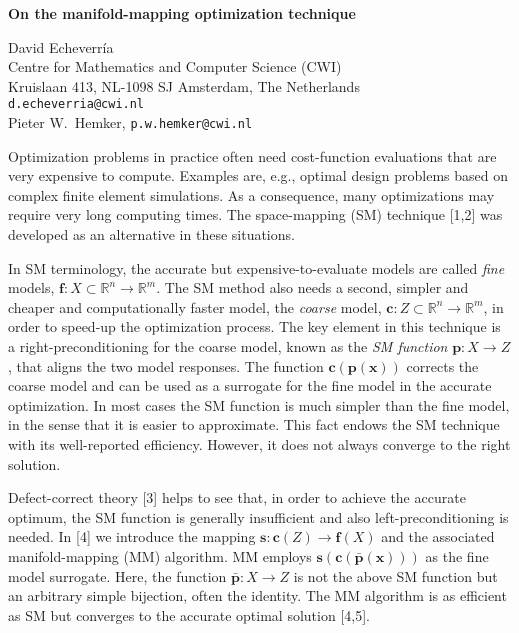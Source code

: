 \documentclass{report}
\newcommand{\Reals}{\mathbb{R}}
\begin{document}

\begin{center}
{\large
{\bf On the manifold-mapping optimization technique}}

	David Echeverr\'{i}a \\
	Centre for Mathematics and Computer Science (CWI)\\
	Kruislaan 413, NL-1098 SJ Amsterdam, The Netherlands \\
	{\tt d.echeverria@cwi.nl} \\
	Pieter W.~Hemker, {\tt p.w.hemker@cwi.nl}
\end{center}
Optimization problems in practice
often need cost-function evaluations that are very expensive
to compute. Examples are, e.g., optimal design problems
based on complex finite element simulations. As a
consequence, many optimizations may require very long
computing times. The space-mapping (SM) technique
[1,2] was developed as an alternative
in these situations.

In SM terminology, the accurate but
expensive-to-evaluate models are called {\it fine} models,
${\mathbf f}:X \subset \Reals^n \to \Reals^m$.
The SM method also
needs a second, simpler and cheaper and computationally
faster model, the {\it coarse} model,
${\mathbf c}:Z \subset \Reals^n \to \Reals^m$,
in order to speed-up the optimization
process. The key element in this technique is a
right-preconditioning for the coarse model, known as the
{\it SM function}
${\mathbf p}:X \to Z$, that aligns the two
model responses.
The function ${\mathbf c}({\mathbf p}({\mathbf x}))$
corrects the coarse model and
can be used as a surrogate for the fine
model in the accurate optimization. In most cases the SM
function is much simpler than the fine model, in the sense
that it is easier to approximate. This fact endows the SM
technique with its well-reported efficiency. However, it
does not always converge to the right solution.


Defect-correct theory [3] helps to see that, in order
to achieve the accurate optimum, the SM function is
generally insufficient and also left-preconditioning is
needed.  In [4] we introduce the mapping
${\mathbf s}:{\mathbf c}(Z) \to {\mathbf f}(X)$
and the associated
manifold-mapping (MM) algorithm. MM employs
${\mathbf s}({\mathbf c}({\bar{{\mathbf p}}}({\mathbf x})))$
as the fine model surrogate. Here, the
function ${\bar{{\mathbf p}}}:X \to Z$
is not the above SM function but an
arbitrary simple bijection, often the identity.
The MM algorithm is as efficient as SM but converges
to the accurate optimal solution [4,5].
\end{document}
